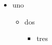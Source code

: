 \documentclass{article}
\begin{document}
\begin{itemize}[leftmargin=*]
\item uno
\begin{itemize}[leftmargin=*]\item dos\begin{itemize}[leftmargin=*]\item tres\end{itemize}\end{itemize}
\end{itemize}
\end{document}
